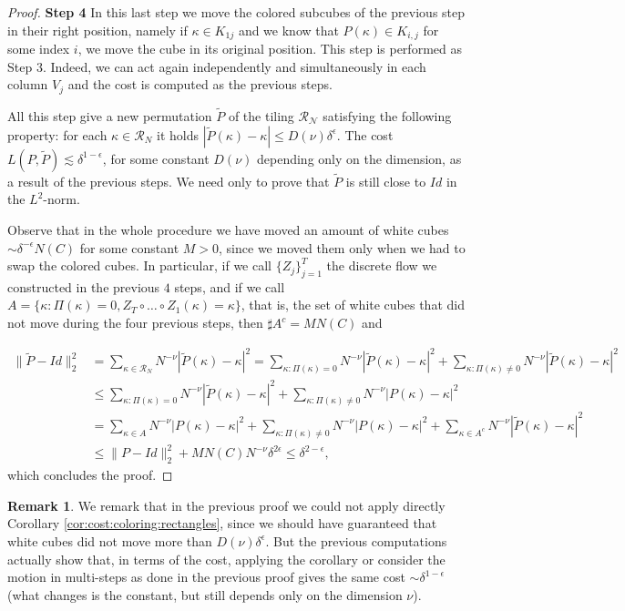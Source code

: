 \documentclass[12 pt]{article}
\theoremstyle{definition} \newtheorem{definition}{Definition}[section]
\theoremstyle{definition} \newtheorem{remark}[definition]{Remark}
\theoremstyle{plain} \newtheorem{lemma}[definition]{Lemma}
\theoremstyle{plain} \newtheorem{proposition}[definition]{Proposition}
\theoremstyle{plain} \newtheorem{theorem}[definition]{Theorem}
\theoremstyle{plain} \newtheorem{corollary}[definition]{Corollary}
\theoremstyle{definition} \newtheorem{example}[definition]{Example}
\theoremstyle{definition} \newtheorem{assumption}[definition]{Assumption}
\theoremstyle{definition} \newtheorem{conjecture}[definition]{Conjecture}
\newcommand{\1}{\mathbbm 1}
\numberwithin{equation}{section}
\begin{document}
\begin{proof}
\textbf{Step 4} In this last step we move the colored subcubes of the previous step in their right position, namely if $\kappa\in K_{1j}$ and we know that $P(\kappa)\in K_{i,j}$ for some index $i$, we move the cube in its original position. This step is performed as Step $3$. Indeed, we can act again independently and simultaneously in each column $V_j$ and the cost is computed as the previous steps. 

\medskip

All this step give a new permutation $\tilde P$ of the tiling $\mathcal{R_N}$ satisfying the following property: for each $\kappa\in \mathcal{R}_N$ it holds $|\tilde P(\kappa)-\kappa|\leq D(\nu)\delta^\epsilon$. The cost $L(P,\tilde P)\lesssim \delta^{1-\epsilon}$, for some constant $D(\nu)$ depending only on the dimension, as a result of the previous steps. We need only to prove that $\tilde P$ is still close to $Id$ in the $L^2$-norm.

\medskip

Observe that in the whole procedure we have moved an amount of white cubes $\sim \delta^{-\epsilon} N(C)$ for some constant $M>0$, since we moved them only when we had to swap the colored cubes. In particular, if we call $\lbrace Z_j\rbrace_{j=1}^T$ the discrete flow we constructed in the previous $4$ steps, and if we call $A=\lbrace\kappa:\Pi(\kappa)=0,Z_T\circ\dots\circ Z_1(\kappa)=\kappa\rbrace$, that is, the set of white cubes that did not move during the four previous steps, then $\sharp A^c=MN(C)$ and 

\medskip 

\begin{align*}
    \|\tilde P-Id\|^2_2&=\sum_{\kappa\in\mathcal{R}_N}N^{-\nu}|\tilde P(\kappa)-\kappa|^2=\sum_{\kappa:\Pi(\kappa)=0}N^{-\nu}|\tilde P(\kappa)-\kappa|^2+\sum_{\kappa :\Pi(\kappa)\not=0}N^{-\nu}|\tilde P(\kappa)-\kappa|^2\\&\leq \sum_{\kappa:\Pi(\kappa)=0}N^{-\nu}|\tilde P(\kappa)-\kappa|^2+\sum_{\kappa :\Pi(\kappa)\not=0}N^{-\nu}| P(\kappa)-\kappa|^2\\ &=\sum_{\kappa\in A}N^{-\nu}| P(\kappa)-\kappa|^2+\sum_{\kappa :\Pi(\kappa)\not=0}N^{-\nu}| P(\kappa)-\kappa|^2+\sum_{\kappa\in A^c}N^{-\nu}| \tilde P(\kappa)-\kappa|^2 \\&\leq \|P-Id\|^2_2+MN(C)N^{-\nu}\delta^{2\epsilon}\leq\delta^{2-\epsilon},
\end{align*}
which concludes the proof. 
\end{proof}
\begin{remark}
    We remark that in the previous proof 
    we could not apply directly Corollary \ref{cor:cost:coloring:rectangles}, since we should have guaranteed that white cubes did not move more than $D(\nu)\delta^\epsilon$. But the previous computations actually show that, in terms of the cost, applying the corollary or consider the motion in multi-steps as done in the previous proof gives the same cost $\sim\delta^{1-\epsilon}$ (what changes is the constant, but still depends only on the dimension $\nu$).
\end{remark}
\end{document}
